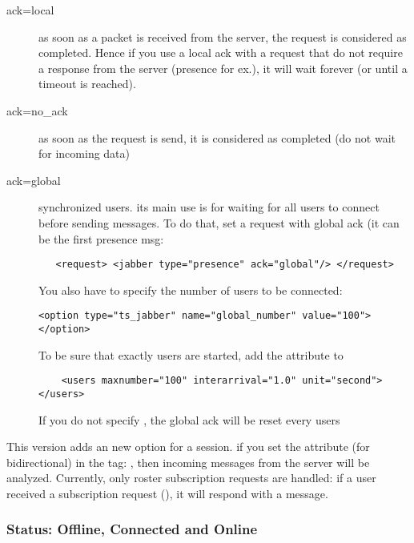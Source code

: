 \documentclass{TSUNG-en}
\begin{document}
\begin{description}
 \item[ack=local] as soon as a packet is received from the server, the
request is considered as completed. Hence if you use a local ack with a request
that do not require a response from the server (presence for ex.), it
 will wait forever (or until a timeout is reached).
 \item[ack=no\_ack] as soon as the request is send, it is considered as completed (do
not wait for incoming data)
 \item[ack=global] synchronized users. its main use is for waiting for all
users to connect before sending messages. To do that, set a request
with global ack (it can be the first presence msg:

\begin{Verbatim}
   <request> <jabber type="presence" ack="global"/> </request>
\end{Verbatim}


You also have to specify the number of users to be connected:

\begin{Verbatim}
<option type="ts_jabber" name="global_number" value="100"></option>
\end{Verbatim}

To be sure that exactly  users are started, add the
 attribute to 

\begin{Verbatim}
    <users maxnumber="100" interarrival="1.0" unit="second"></users>
\end{Verbatim}

If you do not specify , the global ack will be reset every
 users
\end{description}

\label{bidi:presence}
 This version adds an new option for a
session. if you set the attribute  (for bidirectional)
in the  tag: ,
then incoming messages from the server will be analyzed. Currently,
only roster subscription requests are handled: if a user received a
subscription request (), it
will respond with a 
message.

\subsubsection{Status: Offline, Connected and Online}
\end{document}
